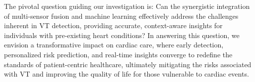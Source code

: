 The pivotal question guiding our investigation is: Can the synergistic integration of multi-sensor fusion and machine learning effectively address the challenges inherent in VT detection, providing accurate, context-aware insights for individuals with pre-existing heart conditions? In answering this question, we envision a transformative impact on cardiac care, where early detection, personalized risk prediction, and real-time insights converge to redefine the standards of patient-centric healthcare, ultimately mitigating the risks associated with VT and improving the quality of life for those vulnerable to cardiac events.

 
